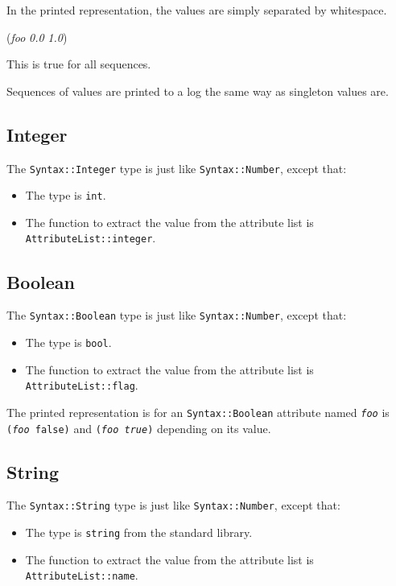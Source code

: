 \documentclass{article}
\newcommand{\cplusplus}%
{{\leavevmode{\rm{\hbox{C\hskip -0.1ex\raise 0.5ex\hbox{\tiny ++}}}}}}
\newcommand{\code}[1]{\texttt{#1}}
\begin{document}
In the printed representation, the values are simply separated by
whitespace. 
\begin{center}
  \begin{tt}
    (\textit{foo} \textit{0.0} \textit{1.0})
  \end{tt}
\end{center}
This is true for all sequences.

Sequences of values are printed to a log the same way as singleton
values are.

\subsection{Integer}

The \code{Syntax::Integer} type is just like \code{Syntax::Number},
except that:
\begin{itemize}
\item The \cplusplus{} type is \code{int}.
\item The function to extract the value from the attribute list is\\
  \code{AttributeList::integer}. 
\end{itemize}

\subsection{Boolean}

The \code{Syntax::Boolean} type is just like \code{Syntax::Number},
except that:
\begin{itemize}
\item The \cplusplus{} type is \code{bool}.
\item The function to extract the value from the attribute list is\\
  \code{AttributeList::flag}. 
\end{itemize}

The printed representation is for an \code{Syntax::Boolean} attribute
named \texttt{\textit{foo}} is \texttt{(\textit{foo} false)} and
\texttt{(\textit{foo true})} depending on its value.

\subsection{String}

The \code{Syntax::String} type is just like \code{Syntax::Number},
except that:
\begin{itemize}
\item The \cplusplus{} type is \code{string} from the standard
  \cplusplus{} library.
\item The function to extract the value from the attribute list is\\
  \code{AttributeList::name}. 
\end{itemize}
\end{document}
